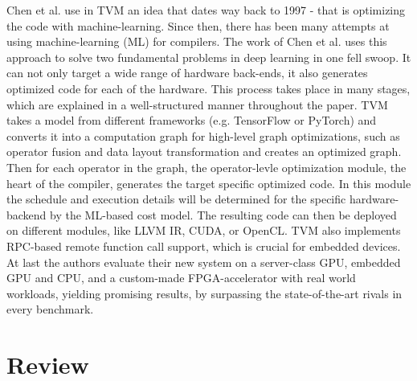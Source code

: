 Chen et al. use in TVM an idea that dates way back to 1997 - that is optimizing the code with machine-learning.
Since then, there has been many attempts at using machine-learning (ML) for compilers.
The work of Chen et al. uses this approach to solve two fundamental problems in deep learning in one fell swoop.
It can not only target a wide range of hardware back-ends, it also generates optimized code for each of the hardware.
This process takes place in many stages, which are explained in a well-structured manner throughout the paper.
TVM takes a model from different frameworks (e.g. TensorFlow or PyTorch) and converts it into a computation graph 
for high-level graph optimizations, such as operator fusion and data layout transformation and creates an optimized graph.
Then for each operator in the graph, the operator-levle optimization module, the heart of the compiler, generates the target specific 
optimized code. In this module the schedule and execution details will be determined for the specific hardware-backend by the ML-based cost model.
The resulting code can then be deployed on different modules, like LLVM IR, CUDA, or OpenCL. TVM also implements RPC-based remote function call support,
which is crucial for embedded devices. At last the authors evaluate their new system on a server-class GPU, embedded GPU and CPU, and a custom-made FPGA-accelerator
with real world workloads, yielding promising results, by surpassing the state-of-the-art rivals in every benchmark.
\section{Review}

